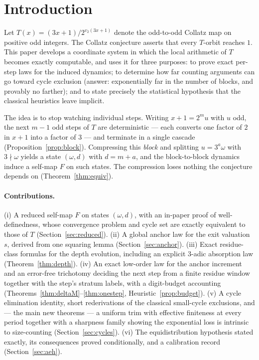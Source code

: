 \documentclass[11pt]{article}
\theoremstyle{remark}
\newcommand{\vt}[1]{v_2\!\left(#1\right)}
\newcommand{\w}{\omega}
\begin{document}
\section{Introduction}

Let $T(x) = (3x+1)/2^{\vt{3x+1}}$ denote the odd-to-odd Collatz map on positive odd integers. The Collatz conjecture asserts that every $T$-orbit reaches $1$. This paper develops a coordinate system in which the local arithmetic of $T$ becomes exactly computable, and uses it for three purposes: to prove exact per-step laws for the induced dynamics; to determine how far counting arguments can go toward cycle exclusion (answer: exponentially far in the number of blocks, and provably no farther); and to state precisely the statistical hypothesis that the classical heuristics leave implicit.

The idea is to stop watching individual steps. Writing $x + 1 = 2^m u$ with $u$ odd, the next $m-1$ odd steps of $T$ are deterministic --- each converts one factor of $2$ in $x+1$ into a factor of $3$ --- and terminate in a single cascade (Proposition~\ref{prop:block}). Compressing this \emph{block} and splitting $u = 3^a\w$ with $3\nmid\w$ yields a state $(\w, d)$ with $d = m + a$, and the block-to-block dynamics induce a self-map $F$ on such states. The compression loses nothing the conjecture depends on (Theorem~\ref{thm:equiv}).

\paragraph{Contributions.} (i) A reduced self-map $F$ on states $(\w,d)$, with an in-paper proof of well-definedness, whose convergence problem and cycle set are exactly equivalent to those of $T$ (Section~\ref{sec:reduced}). (ii) A global anchor law for the exit valuation $s$, derived from one squaring lemma (Section~\ref{sec:anchor}). (iii) Exact residue-class formulas for the depth evolution, including an explicit $3$-adic absorption law (Theorem~\ref{thm:depth}). (iv) An exact low-order law for the anchor increment and an error-free trichotomy deciding the next step from a finite residue window together with the step's stratum labels, with a digit-budget accounting (Theorems~\ref{thm:deltaM}--\ref{thm:onestep}, Heuristic~\ref{prop:budget}). (v) A cycle elimination identity, short rederivations of the classical small-cycle exclusions, and --- the main new theorems --- a uniform trim with effective finiteness at every period together with a sharpness family showing the exponential loss is intrinsic to size-counting (Section~\ref{sec:cycles}). (vi) The equidistribution hypothesis stated exactly, its consequences proved conditionally, and a calibration record (Section~\ref{sec:aeh}).
\end{document}
